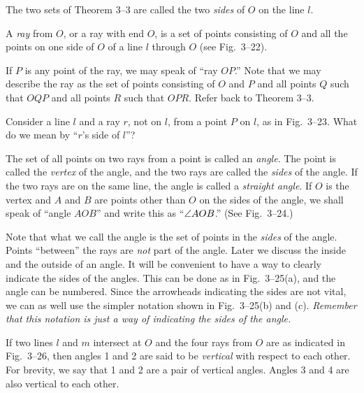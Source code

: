 \documentclass[11pt]{book}
\theoremstyle{bkplain}
\begin{document}
\begin{definition}
The two sets of Theorem 3--3 are called the two \emph{sides} of $O$ on the line
$l$.
\end{definition}

\begin{definition}
A \emph{ray} from $O$, or a ray with end $O$, is a set of points consisting of
$O$ and all the points on one side of $O$ of a line $l$ through $O$ (see
Fig.~3--22).
\end{definition}

If $P$ is any point of the ray, we may speak of ``ray $OP$.'' Note that we may
describe the ray as the set of points consisting of $O$ and $P$ and all points
$Q$ such that $OQP$ and all points $R$ such that $OPR$. Refer back to
Theorem 3--3.

\FIGIIITWENTYTWOTWENTYTHREE

Consider a line $l$ and a ray $r$, not on $l$, from a point $P$ on $l$, as in
Fig.~3--23. What do we mean by ``$r$'s side of $l$''?

\begin{definition}
The set of all points on two rays from a point is called an \emph{angle}. The
point is called the \emph{vertex} of the angle, and the two rays are called the
\emph{sides} of the angle. If the two rays are on the same line, the angle is
called a \emph{straight angle}. If $O$ is the vertex and $A$ and $B$ are points
other than $O$ on the sides of the angle, we shall speak of ``angle $AOB$'' and
write this as ``$\angle AOB$.'' (See Fig.~3--24.)
\end{definition}

\FIGIIITWENTYFOURTWENTYFIVE

\begin{remark}
Note that what we call the angle is the set of points in the \emph{sides} of the
angle. Points ``between'' the rays are \emph{not} part of the angle. Later we
discuss the inside and the outside of an angle. It will be convenient to have a
way to clearly indicate the sides of the angles. This can be done as in
Fig.~3--25(a), and the angle can be numbered. Since the arrowheads indicating the
sides are not vital, we can as well use the simpler notation shown in
Fig.~3--25(b) and (c). \emph{Remember that this notation is just a way of
indicating the sides of the angle.}
\end{remark}

\begin{definition}
If two lines $l$ and $m$ intersect at $O$ and the four rays from $O$ are as
indicated in Fig.~3--26, then angles 1 and 2 are said to be \emph{vertical} with
respect to each other. For brevity, we say that 1 and 2 are a pair of vertical
angles. Angles 3 and 4 are also vertical to each other.
\end{definition}
\end{document}
